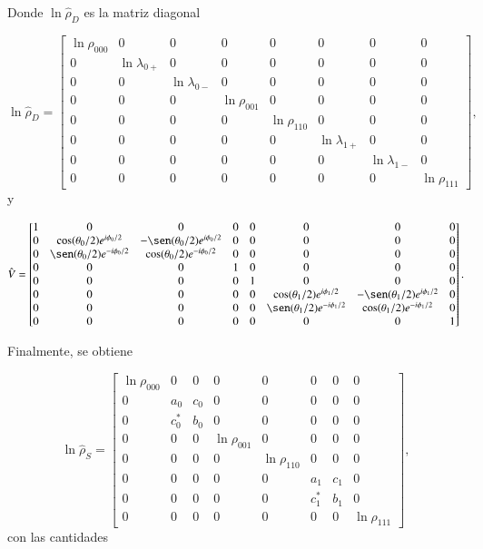 \begin{appendixs}
Donde $\ln \hat{\rho}_{D}$ es la matriz diagonal 

\begin{equation*}
    \ln \hat{\rho}_{D} = 
    \begin{bmatrix}
        \ln \rho_{000} & 0 & 0 & 0 & 0 & 0 & 0 & 0 \\
        0 & \ln \lambda_{0+} & 0 & 0 & 0 & 0 & 0 & 0 \\
        0 & 0 & \ln \lambda_{0-} & 0 & 0 & 0 & 0 & 0 \\
        0 & 0 & 0 & \ln \rho_{001} & 0 & 0 & 0 & 0 \\
        0 & 0 & 0 & 0 & \ln \rho_{110} & 0 & 0 & 0 \\
        0 & 0 & 0 & 0 & 0 & \ln \lambda_{1+} & 0 & 0 \\
        0 & 0 & 0 & 0 & 0 & 0 & \ln \lambda_{1-} & 0 \\
        0 & 0 & 0 & 0 & 0 & 0 & 0 & \ln \rho_{111} 
        \end{bmatrix},
\end{equation*}
y 

\begin{equation*}
    \hat{V} = 
    \begin{bmatrix}
        1 & 0 & 0 & 0 & 0 & 0 & 0 & 0 \\
        0 & \cos(\theta_{0}/2)e^{i\phi_{0}/2} & -\sen(\theta_{0}/2)e^{i\phi_{0}/2} & 0 & 0 & 0 & 0 & 0 \\
        0 & \sen(\theta_{0}/2)e^{-i\phi_{0}/2} & \cos(\theta_{0}/2)e^{-i\phi_{0}/2} & 0 & 0 & 0 & 0 & 0 \\
        0 & 0 & 0 & 1 & 0 & 0 & 0 & 0 \\
        0 & 0 & 0 & 0 & 1 & 0 & 0 & 0 \\
        0 & 0 & 0 & 0 & 0 &  \cos(\theta_{1}/2)e^{i\phi_{1}/2} & -\sen(\theta_{1}/2)e^{i\phi_{1}/2} & 0 \\
        0 & 0 & 0 & 0 & 0 & \sen(\theta_{1}/2)e^{-i\phi_{1}/2} & \cos(\theta_{1}/2)e^{-i\phi_{1}/2} & 0 \\
        0 & 0 & 0 & 0 & 0 & 0 & 0 & 1 
        \end{bmatrix}.
\end{equation*}

Finalmente, se obtiene

\begin{equation*}
    \ln \hat{\rho}_{S} = 
    \begin{bmatrix}
        \ln \rho_{000} & 0 & 0 & 0 & 0 & 0 & 0 & 0 \\
        0 & a_{0} & c_{0} & 0 & 0 & 0 & 0 & 0 \\
        0 & c^{*}_{0} & b_{0} & 0 & 0 & 0 & 0 & 0 \\
        0 & 0 & 0 & \ln \rho_{001} & 0 & 0 & 0 & 0 \\
        0 & 0 & 0 & 0 & \ln \rho_{110} & 0 & 0 & 0 \\
        0 & 0 & 0 & 0 & 0 & a_{1} & c_{1} & 0 \\
        0 & 0 & 0 & 0 & 0 & c^{*}_{1} & b_{1} & 0 \\
        0 & 0 & 0 & 0 & 0 & 0 & 0 & \ln \rho_{111} 
        \end{bmatrix},
\end{equation*}
con las cantidades 


\end{appendixs}
